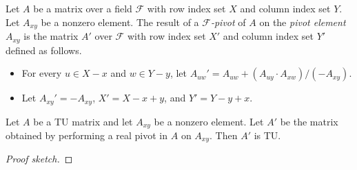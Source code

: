 \begin{definition}
  \label{def:code_pivot}
  Let $A$ be a matrix over a field $\mathcal{F}$ with row index set $X$ and column index set $Y$.
  Let $A_{xy}$ be a nonzero element.
  The result of a \emph{$\mathcal{F}$-pivot} of $A$ on the \emph{pivot element} $A_{xy}$
  is the matrix $A'$ over $\mathcal{F}$ with row index set $X'$ and column index set $Y'$ defined as follows.
  \begin{itemize}
    \item For every $u \in X - x$ and $w \in Y - y$, let $A_{uw}' = A_{uw} + (A_{uy} \cdot A_{xw}) / (-A_{xy})$.
    \item Let $A_{xy}' = -A_{xy}$, $X' = X - x + y$, and $Y' = Y - y + x$.
  \end{itemize}
\end{definition}

\begin{lemma}
  \label{lem:code_pivot_tu}
  Let $A$ be a TU matrix and let $A_{xy}$ be a nonzero element.
  Let $A'$ be the matrix obtained by performing a real pivot in $A$ on $A_{xy}$.
  Then $A'$ is TU.
\end{lemma}

\begin{proof}[Proof sketch]
\end{proof}
